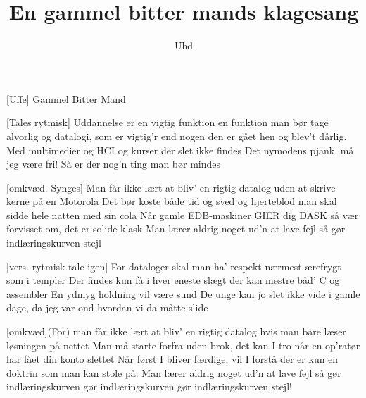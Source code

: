 \documentclass[a4paper,11pt]{article}
\title{En gammel bitter mands klagesang}
\author{Uhd}
\begin{document}
\maketitle

\begin{roles}
[Uffe] Gammel Bitter Mand
\end{roles}

\begin{props}
\end{props}
  
\begin{song}

[Tales rytmisk] Uddannelse er en vigtig funktion
en funktion man bør tage alvorlig
og datalogi, som er vigtig'r end nogen
den er gået hen og blev't dårlig.
Med multimedier og HCI
og kurser der slet ikke findes
Det nymodens pjank, må jeg være fri!
Så er der nog'n ting man bør mindes 

[omkvæd. Synges] Man får ikke lært at bliv' en rigtig datalog
uden at skrive kerne på en Motorola
Det bør koste både tid og sved og hjerteblod
man skal sidde hele natten med sin cola
Når gamle EDB-maskiner GIER dig DASK
så vær forvisset om, det er solide klask
Man lærer aldrig noget ud'n at lave fejl
så gør indlæringskurven stejl

[vers. rytmisk tale igen] For dataloger skal man ha' respekt
nærmest ærefrygt som i templer
Der findes kun få i hver eneste slægt
der kan mestre båd' C og assembler
En ydmyg holdning vil være sund
De unge kan jo slet ikke vide
i gamle dage, da jeg var ond
hvordan vi da måtte slide

[omkvæd](For) man får ikke lært at bliv' en rigtig datalog
hvis man bare læser løsningen på nettet
Man må starte forfra uden brok, det kan I tro
når en op'ratør har fået din konto slettet
Når først I bliver færdige, vil I forstå
der er kun en doktrin som man kan stole på:
Man lærer aldrig noget ud'n at lave fejl
så gør indlæringskurven
gør indlæringskurven
gør indlæringskurven stejl!


\end{song}
\end{document}
